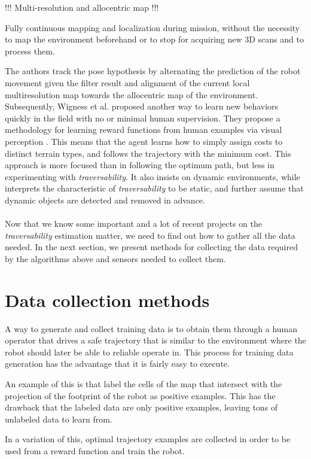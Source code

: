 \documentclass[12pt,a4paper]{report}
\newcommand{\etal}[1]{#1 et al.}
\newcommand{\term}{\textit}
\begin{document}
	!!! Multi-resolution and allocentric map !!!
	
	Fully continuous mapping and
	localization during mission, without the necessity to map the environment beforehand
	or to stop for acquiring new 3D scans and to process them.
	
	The authors track the pose hypothesis by alternating the prediction of the robot 
	movement given the filter result and alignment of the current local multiresolution 
	map towards the allocentric map of the environment.
	\\
	
	Subsequently, \etal{Wigness} proposed another way to learn new behaviors quickly 
	in the field with no or minimal human supervision. They propose a methodology 
	for learning reward functions from human examples via visual perception 
	\cite{Wigness}. This means that the agent learns how to simply assign costs to 
	distinct terrain types, and follows the trajectory with the minimum cost. This 
	approach is more focused than \cite{Suger} in following the optimum path, but 
	less in experimenting with \term{traversability}. It also insists on dynamic 
	environments, while \cite{Suger} interprets the characteristic of 
	\term{traversability} to be static, and further assume that dynamic objects are 
	detected and removed in advance.
	\\\\
	
	
	Now that we know some important and a lot of recent projects on the 
	\term{traversability} estimation matter, we need to find out how to gather all 
	the data needed. In the next section, we present methods for collecting the data 
	required by the algorithms above and sensors needed to collect them.
	\\
	
	\section{Data collection methods}
	\label{sec:bg:data}
	
	A way to generate and collect training data is to obtain them through a human 
	operator that drives a safe trajectory that is similar to the environment where 
	the robot should later be able to reliable operate in. This process for training 
	data generation has the advantage that it is fairly easy to execute.
	\par 
	An example of this is \cite{Suger} that label the cells of the map that 
	intersect with the projection of the footprint of the robot as positive examples. 
	This has the drawback that the labeled data are only positive examples, leaving 
	tons of unlabeled data to learn from.
	\par 
	In a variation of this, optimal trajectory examples are collected \cite{Wigness} 
	in order to be used from a reward function and train the robot.
	\\
	
\end{document}
